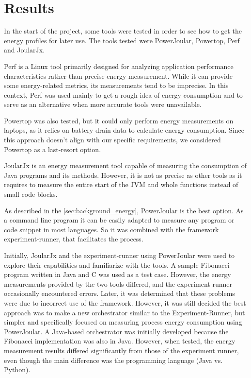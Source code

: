 \chapter{Results}\label{chapter:results}

In the start of the project, some tools were tested in order to see how to get the energy profiles for later use. The tools tested were PowerJoular, Powertop, Perf and JoularJx.

Perf is a Linux tool primarily designed for analyzing application performance characteristics rather than precise energy measurement. While it can provide some energy-related metrics, its measurements tend to be imprecise. In this context, Perf was used mainly to get a rough idea of energy consumption and to serve as an alternative when more accurate tools were unavailable.

Powertop was also tested, but it could only perform energy measurements on laptops, as it relies on battery drain data to calculate energy consumption. Since this approach doesn't align with our specific requirements, we considered Powertop as a last-resort option.

JoularJx is an energy measurement tool capable of measuring the consumption of Java programs and its methods. However, it is not as precise as other tools as it requires to measure the entire start of the JVM and whole functions instead of small code blocks.

As described in the \ref{sec:background_energy}, PowerJoular is the best option. As a command line program it can be easily adapted to measure any program or code snippet in most languages. So it was combined with the framework experiment-runner, that facilitates the process.

Initially, JoularJx and the experiment-runner using PowerJoular were used to explore their capabilities and familiarize with the tools. A sample Fibonacci program written in Java and C was used as a test case. However, the energy measurements provided by the two tools differed, and the experiment runner occasionally encountered errors. Later, it was determined that these problems were due to incorrect use of the framework. However, it was still decided the best approach was to make a new orchestrator similar to the Experiment-Runner, but simpler and specifically focused on measuring process energy consumption using PowerJoular. A Java-based orchestrator was initially developed because the Fibonacci implementation was also in Java. However, when tested, the energy measurement results differed significantly from those of the experiment runner, even though the main difference was the programming language (Java vs. Python).

